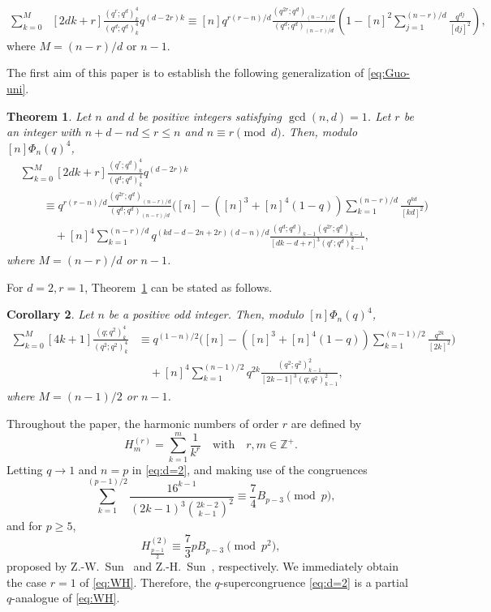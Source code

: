 \documentclass[12pt]{article}
\newtheorem{thm}{Theorem}[section]
\newtheorem{cor}[thm]{Corollary}
\def\Z{{\mathbb Z}}
\numberwithin{equation}{section}
\begin{document}
\begin{align}\label{eq:Guo-uni}
    \sum_{k=0}^{M}&[2dk+r]\frac{(q^r;q^d)_k^4}{(q^d;q^d)^4_k}q^{(d-2r)k}
    \equiv [n]q^{r(r-n)/d}\frac{(q^{2r};q^d)_{(n-r)/d}}{(q^d;q^d)_{(n-r)/d}}\left(1-[n]^2\sum_{j=1}^{(n-r)/d}\frac{q^{dj}}{[dj]^2}\right),
\end{align}
where $M=(n-r)/d$ or $n-1$.\par
The first aim of this paper is to establish the following generalization of \eqref{eq:Guo-uni}.
\begin{thm}\label{thm:main-1}
Let $n$ and $d$ be positive integers satisfying $\gcd(n,d)=1$. Let $r$ be an integer with $n+d-nd\leqslant r \leqslant n$ and 
    $n\equiv r \pmod{d} $. Then, modulo $[n]\Phi_n(q)^4$,
    \begin{align*}
        &\sum_{k=0}^{M}[2dk+r]\frac{(q^r;q^d)_k^4}{(q^d;q^d)_k^4}q^{(d-2r)k}\nonumber\\
        &\hspace{2em}\equiv q^{r(r-n)/d}\frac{(q^{2r};q^d)_{(n-r)/d}}{(q^{d};q^d)_{(n-r)/d}}\Bigg([n]-([n]^3+[n]^4(1-q))\sum_{k=1}^{(n-r)/d}\frac{q^{kd}}{[kd]^2}\Bigg)\nonumber\\
        &\hspace{3em}+[n]^4\sum_{k=1}^{(n-r)/d}q^{(kd-d-2n+2r)(d-n)/d}\frac{(q^d;q^d)_{k-1}(q^{2r};q^d)_{k-1}}{[dk-d+r]^3(q^r;q^d)_{k-1}^2},
    \end{align*}
    where $M=(n-r)/d$ or $n-1$.
\end{thm}
For $d=2,r=1$, Theorem~\ref{thm:main-1} can be stated as follows.
\begin{cor}
Let $n$ be a positive odd integer. Then, modulo $[n]\Phi_n(q)^4$,
    \begin{align}\label{eq:d=2}
        \sum_{k=0}^{M}[4k+1]\frac{(q;q^2)_k^4}{(q^2;q^2)_k^4}
        &\equiv q^{(1-n)/2}\Bigg([n]-([n]^3+[n]^4(1-q))\sum_{k=1}^{(n-1)/2}\frac{q^{2k}}{[2k]^2}\Bigg)\nonumber\\
        &\hspace{1em}+[n]^4\sum_{k=1}^{(n-1)/2}q^{2k}\frac{(q^2;q^2)_{k-1}^2}{[2k-1]^3(q;q^2)_{k-1}^2},
    \end{align}
    where $M=(n-1)/2$ or $n-1$.
\end{cor} 
Throughout the paper, the harmonic numbers of order $r$ are defined by
\[H^{(r)}_m=\sum_{k=1}^{m}\frac{1}{k^r} \hspace{1em}\text{with}\hspace{1em} r,m\in \Z^+.\]
Letting $q\to 1$ and $n=p$ in \eqref{eq:d=2}, and making use of the congruences
\[
\sum_{k=1}^{(p-1)/2}\frac{16^{k-1}}{(2k-1)^3\binom{2k-2}{k-1}^2}
\equiv \frac{7}{4}B_{p-3}\pmod{p},
\]
and for $p\geqslant 5$,
\[
H_{\frac{p-1}{2}}^{(2)}\equiv \frac{7}{3}pB_{p-3}\pmod{p^2},
\]
proposed by Z.-W.~Sun~\cite{Sun} and Z.-H.~Sun~\cite[Corollary~5.2]{Sunzh}, respectively.
We immediately obtain the case $r=1$ of \eqref{eq:WH}. Therefore, the $q$-supercongruence 
\eqref{eq:d=2} is a partial $q$-analogue of \eqref{eq:WH}. 
\end{document}
